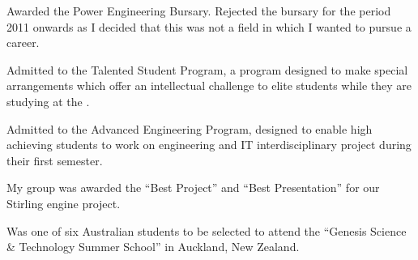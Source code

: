 \begin{achievements}

{Awarded the  Power Engineering Bursary.
Rejected the bursary for the period 2011 onwards as I decided that this was not
a field in which I wanted to pursue a career.}

{Admitted to the  Talented Student
Program, a program designed to make special arrangements which offer an
intellectual challenge to elite students while they are studying at the
.}

{Admitted to the  Advanced
Engineering Program, designed to enable high achieving students to work on
engineering and IT interdisciplinary project during their first semester.

My group was awarded the ``Best Project'' and ``Best Presentation'' for our
Stirling engine project.}

{Was one of six Australian students to be selected to attend the ``Genesis
Science \& Technology Summer School'' in Auckland, New Zealand.}

\end{achievements}
